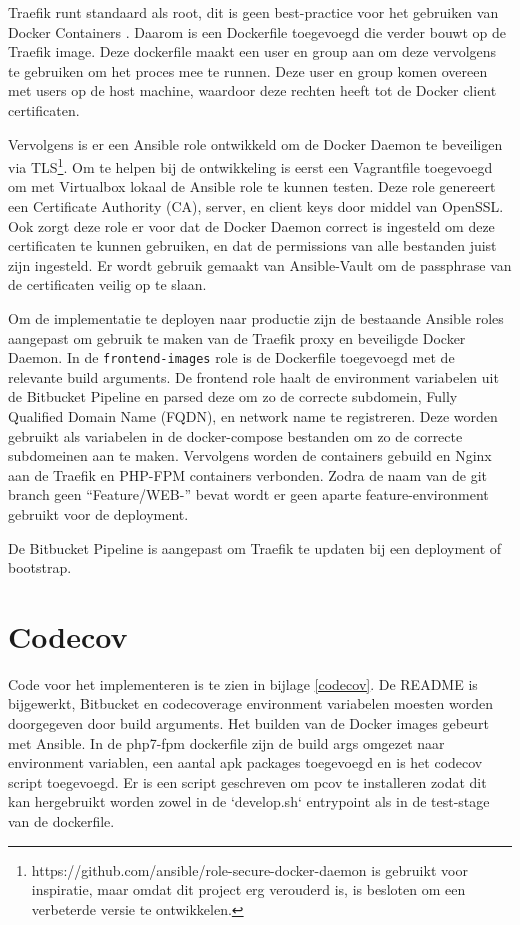 Traefik runt standaard als root, dit is geen best-practice voor het gebruiken van Docker Containers \parencite{DockerBestPractices}. Daarom is een Dockerfile toegevoegd die verder bouwt op de Traefik image. Deze dockerfile maakt een user en group aan om deze vervolgens te gebruiken om het proces mee te runnen. Deze user en group komen overeen met users op de host machine, waardoor deze rechten heeft tot de Docker client certificaten.

Vervolgens is er een Ansible role ontwikkeld om de Docker Daemon te beveiligen via TLS\footnote{https://github.com/ansible/role-secure-docker-daemon is gebruikt voor inspiratie, maar omdat dit project erg verouderd is, is besloten om een verbeterde versie te ontwikkelen.}. Om te helpen bij de ontwikkeling is eerst een Vagrantfile toegevoegd om met Virtualbox lokaal de Ansible role te kunnen testen. Deze role genereert een Certificate Authority (CA), server, en client keys door middel van OpenSSL. Ook zorgt deze role er voor dat de Docker Daemon correct is ingesteld om deze certificaten te kunnen gebruiken, en dat de permissions van alle bestanden juist zijn ingesteld. Er wordt gebruik gemaakt van Ansible-Vault om de passphrase van de certificaten veilig op te slaan.

Om de implementatie te deployen naar productie zijn de bestaande Ansible roles aangepast om gebruik te maken van de Traefik proxy en beveiligde Docker Daemon. In de \texttt{frontend-images} role is de Dockerfile toegevoegd met de relevante build arguments. De frontend role haalt de environment variabelen uit de Bitbucket Pipeline en parsed deze om zo de correcte subdomein, Fully Qualified Domain Name (FQDN), en network name te registreren. Deze worden gebruikt als variabelen in de docker-compose bestanden om zo de correcte subdomeinen aan te maken. Vervolgens worden de containers gebuild en Nginx aan de Traefik en PHP-FPM containers verbonden. Zodra de naam van de git branch geen \enquote{Feature/WEB-} bevat wordt er geen aparte feature-environment gebruikt voor de deployment.

De Bitbucket Pipeline is aangepast om Traefik te updaten bij een deployment of bootstrap.

\section{Codecov}
Code voor het implementeren is te zien in bijlage \ref{codecov}. De README is bijgewerkt, Bitbucket en codecoverage environment variabelen moesten worden doorgegeven door build arguments. Het builden van de Docker images gebeurt met Ansible. In de php7-fpm dockerfile zijn de build args omgezet naar environment variablen, een aantal apk packages toegevoegd en is het codecov script toegevoegd. Er is een script geschreven om pcov te installeren zodat dit kan hergebruikt worden zowel in de `develop.sh` entrypoint als in de test-stage van de dockerfile.

